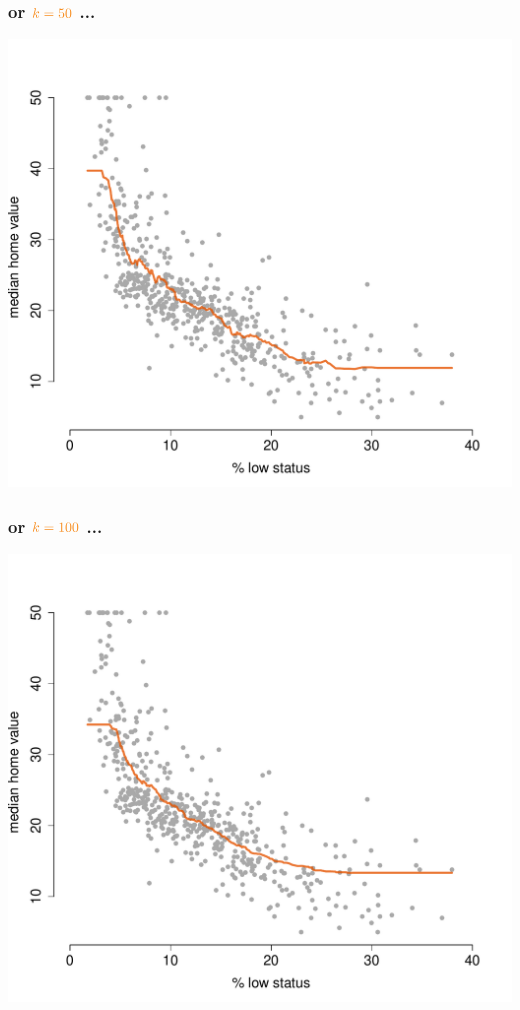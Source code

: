 \documentclass{beamer}
\newcommand{\bo}[1]{\textcolor{burntorange}{#1}}
\begin{document}
\begin{frame}[plain]
\frametitle{or $\bo{k=50}$ ...}
\vspace{-8mm}
\begin{center}
\includegraphics[scale=.44]{DaveBostonplotk=50i=3.pdf}
\end{center}
\end{frame}


\begin{frame}[plain]
\frametitle{or $\bo{k=100}$ ...}
\vspace{-8mm}
\begin{center}
\includegraphics[scale=.44]{DaveBostonplotk=100i=4.pdf}
\end{center}
\end{frame}
\end{document}
